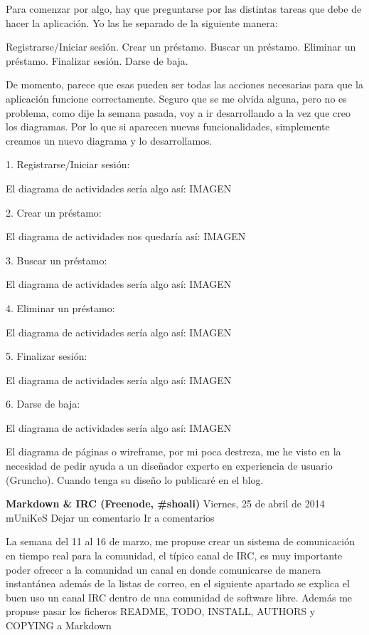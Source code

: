 \documentclass[a4paper, 12pt]{book}
\begin{document}
Para comenzar por algo, hay que preguntarse por las distintas tareas que debe de hacer la aplicación. Yo las he separado de la siguiente manera:

    Registrarse/Iniciar sesión.
    Crear un préstamo.
    Buscar un préstamo.
    Eliminar un préstamo.
    Finalizar sesión.
    Darse de baja.

De momento, parece que esas pueden ser todas las acciones necesarias para que la aplicación funcione correctamente. Seguro que se me olvida alguna, pero no es problema, como dije la semana pasada, voy a ir desarrollando a la vez que creo los diagramas. Por lo que si aparecen nuevas funcionalidades, simplemente creamos un nuevo diagrama y lo desarrollamos.

1. Registrarse/Iniciar sesión:

El diagrama de actividades sería algo así:
IMAGEN

2. Crear un préstamo:

El diagrama de actividades nos quedaría así:
IMAGEN

3. Buscar un préstamo:

El diagrama de actividades sería algo así:
IMAGEN

4. Eliminar un préstamo:

El diagrama de actividades sería algo así:
IMAGEN

5. Finalizar sesión:

El diagrama de actividades sería algo así:
IMAGEN

6. Darse de baja:

El diagrama de actividades sería algo así:
IMAGEN

El diagrama de páginas o wireframe, por mi poca destreza, me he visto en la necesidad de pedir ayuda a un diseñador experto en experiencia de usuario (Gruncho). Cuando tenga su diseño lo publicaré en el blog.


\textbf{Markdown & IRC (Freenode, #shoali)}
Viernes, 25 de abril de 2014 mUniKeS    Dejar un comentario Ir a comentarios

La semana del 11 al 16 de marzo, me propuse crear un sistema de  comunicación en tiempo real para la comunidad, el típico canal de IRC, es muy importante poder ofrecer a la comunidad un canal en donde comunicarse de manera instantánea además de la listas de correo, en el siguiente apartado se explica el buen uso un canal IRC dentro de una comunidad de software libre. Además me propuse pasar los ficheros README, TODO, INSTALL, AUTHORS y COPYING a Markdown
\end{document}
